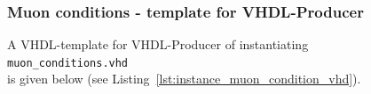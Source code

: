 \clearpage

\subsubsection{Muon conditions - template for VHDL-Producer}
A VHDL-template for VHDL-Producer of instantiating\\ \texttt{muon\_conditions.vhd}\\ is given below (see Listing~\ref{lst:instance_muon_condition_vhd}).\\



